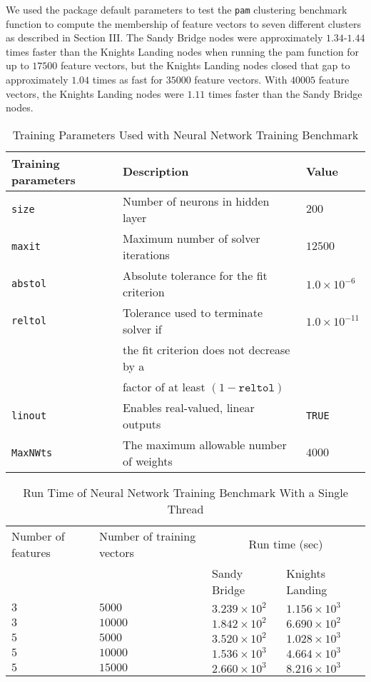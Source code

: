We used the package default parameters to test the \texttt{pam} clustering
  benchmark function to compute the membership of feature vectors to seven
  different clusters as described in Section III.
The Sandy Bridge nodes were approximately $1.34$-$1.44$ times faster than the
  Knights Landing nodes when running the pam function for up to $17500$ feature
  vectors, but the Knights Landing nodes closed that gap to approximately $1.04$
  times as fast for $35000$ feature vectors.
With $40005$ feature vectors, the Knights Landing nodes were $1.11$ times faster
  than the Sandy Bridge nodes.

\begin{table*}
  \caption{Training Parameters Used with Neural Network Training Benchmark}
  \label{tab:nnetParams}
  \begin{tabular}{lll}
    \toprule
    Training parameters & Description & Value\\
    \midrule
      \texttt{size}     & Number of neurons in hidden layer        & $200$ \\
      \texttt{maxit}    & Maximum number of solver iterations      & $12500$ \\
      \texttt{abstol}   & Absolute tolerance for the fit criterion & $1.0\times 10^{-6}$\\
      \texttt{reltol}   & Tolerance used to terminate solver if    & $1.0\times 10^{-11}$\\
                        & the fit criterion does not decrease by a &\\
                        & factor of at least $(1-\mathrm{\texttt{reltol}})$ &\\
      \texttt{linout}   & Enables real-valued, linear outputs      & \texttt{TRUE}\\
      \texttt{MaxNWts}  & The maximum allowable number of weights  & $4000$\\
    \bottomrule
  \end{tabular}
\end{table*}

\begin{table*}
  \caption{Run Time of Neural Network Training Benchmark With a Single Thread}
  \label{tab:nnetResults}
  \begin{tabular}{llll}
    \toprule
      Number of features & Number of training vectors & \multicolumn{2}{c}{Run time (sec)}\\
                         &                            & Sandy Bridge & Knights Landing\\
    \midrule
    $3$ & $5000$  & $3.239\times 10^{2}$ & $1.156\times 10^{3}$ \\
    $3$ & $10000$ & $1.842\times 10^{2}$ & $6.690\times 10^{2}$ \\
    $5$ & $5000$  & $3.520\times 10^{2}$ & $1.028\times 10^{3}$ \\
    $5$ & $10000$ & $1.536\times 10^{3}$ & $4.664\times 10^{3}$ \\
    $5$ & $15000$ & $2.660\times 10^{3}$ & $8.216\times 10^{3}$ \\
    \bottomrule
  \end{tabular}
\end{table*}

